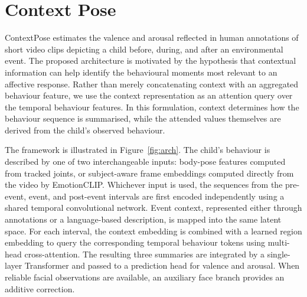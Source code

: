 

\section{Context Pose}
\label{sec:method}

ContextPose estimates the valence and arousal reflected in human annotations of short video clips depicting a child before, during, and after an environmental event. The proposed architecture is motivated by the hypothesis that contextual information can help identify the behavioural moments most relevant to an affective response. Rather than merely concatenating context with an aggregated behaviour feature, we use the context representation as an attention query over the temporal behaviour features. In this formulation, context determines how the behaviour sequence is summarised, while the attended values themselves are derived from the child's observed behaviour.

The framework is illustrated in Figure~\ref{fig:arch}. The child's behaviour is described by one of two interchangeable inputs: body-pose features computed from tracked joints, or subject-aware frame embeddings computed directly from the video by EmotionCLIP. Whichever input is used, the sequences from the pre-event, event, and post-event intervals are first encoded independently using a shared temporal convolutional network. Event context, represented either through annotations or a language-based description, is mapped into the same latent space. For each interval, the context embedding is combined with a learned region embedding to query the corresponding temporal behaviour tokens using multi-head cross-attention. The resulting three summaries are integrated by a single-layer Transformer and passed to a prediction head for valence and arousal. When reliable facial observations are available, an auxiliary face branch provides an additive correction.

